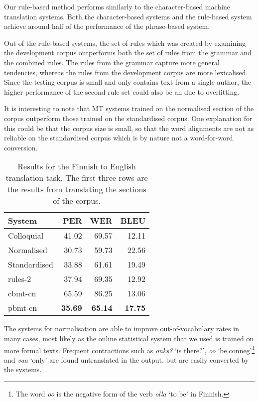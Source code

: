 \documentclass[11pt]{article}
\begin{document}
Our rule-based method performs similarly to the character-based machine translation systems. Both 
the character-based systems and the rule-based system achieve around half of the performance of the phrase-based system.

Out of the rule-based systems, the set of rules which was created by examining the development corpus
outperforms both the set of rules from the grammar and the combined rules.
The rules from the grammar capture more general tendencies, whereas the rules from the development corpus are more lexicalised.
Since the testing corpus is small and only contains text from a single author, the higher performance of the second rule set could also be an due to overfitting.

It is interesting to note that MT systems trained on the normalised section of the corpus outperform
those trained on the standardised corpus. One explanation for this could be that the corpus size is small, so 
that the word alignments are not as reliable on the standardised corpus which is by nature not a word-for-word 
conversion.

\begin{table}
  \centering
  \begin{tabular}{|l|r|r|r|}
     \hline
    \textbf{System} & \textbf{PER} & \textbf{WER} & \textbf{BLEU} \\
     \hline
     Colloquial &  41.02  &  69.57  & 12.11 \\
     Normalised &  30.73  &  59.73  & 22.56 \\
     Standardised &  33.88  &  61.61  & 19.49 \\
     \hline
     rules-2 &  37.94  &  69.35  & 12.92 \\
     \hline
     {\sc cbmt}-cn &  65.59  &  86.25  & 13.06 \\
     {\sc pbmt}-cn &  \textbf{35.69}  &  \textbf{65.14}  & \textbf{17.75} \\
     \hline
  \end{tabular}
  \caption{Results for the Finnish to English translation task. The first three rows are the results 
    from translating the sections of the corpus.}
  \label{table:results-trad}
\end{table}

The systems for normalisation are able to improve out-of-vocabulary rates in 
many cases, most likely as the online statistical system that we used is trained
on more formal texts. Frequent contractions such as \emph{onks?} `is there?',
\emph{oo} `be.{\sc conneg}'\footnote{The word \emph{oo} is the negative form of the verb \emph{olla} `to be' in Finnish.} and \emph{vaa} `only' are found untranslated in the output, but 
are easily converted by the systems.
\end{document}
